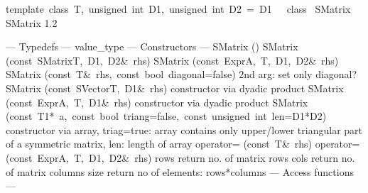\documentclass{article}
\begin{document}
\begin{cxxentry}
\begin{cxxclass}
\begin{cxxdoc}
\end{cxxdoc}
\end{cxxclass}
\begin{cxxclass}
{template\ \<class\ T,\ unsigned\ int\ D1,\ unsigned\ int\ D2\ =\ D1\>\ \ \ class\ }
        {SMatrix}
        {}
        {SMatrix
}
        {1.2}
\begin{cxxpublic}
\cxxitem{}
        {--- Typedefs --- }
        {}
        {}
        {}
\label{cxx.1.2.3}
        {value\_type}
        {}
        {}
        {}
\label{cxx.1.2.4}
\cxxitem{}
        {--- Constructors --- }
        {}
        {}
        {}
\label{cxx.1.2.5}
\cxxitem{}
        {SMatrix}
        {()}
        {}
        {}
\label{cxx.1.2.6}
\cxxitem{}
        {SMatrix}
        {(const\ SMatrix\<T,\ D1,\ D2\>\&\ rhs)}
        {}
        {}
\label{cxx.1.2.7}
        {SMatrix}
        {(const\ Expr\<A,\ T,\ D1,\ D2\>\&\ rhs)}
        {}
        {}
\label{cxx.1.2.8}
\cxxitem{}
        {SMatrix}
        {(const\ T\&\ rhs,\ const\ bool\ diagonal=false)}
        { 2nd arg: set only diagonal?}
        {}
\label{cxx.1.2.9}
\cxxitem{}
        {SMatrix}
        {(const\ SVector\<T,\ D1\>\&\ rhs)}
        { constructor via dyadic product}
        {}
\label{cxx.1.2.10}
        {SMatrix}
        {(const\ Expr\<A,\ T,\ D1\>\&\ rhs)}
        { constructor via dyadic product}
        {}
\label{cxx.1.2.11}
        {SMatrix}
        {(const\ T1*\ a,\ const\ bool\ triang=false,\ const\ unsigned\ int\ len=D1*D2)}
        {constructor via array, triag=true: array contains only upper/lower
triangular part of a symmetric matrix, len: length of array }
        {}
\label{cxx.1.2.12}
        {operator=}
        {(const\ T\&\ rhs)}
        {}
        {}
\label{cxx.1.2.13}
        {operator=}
        {(const\ Expr\<A,\ T,\ D1,\ D2\>\&\ rhs)}
        {}
        {}
\label{cxx.1.2.14}
        {rows}
        {}
        { return no. of matrix rows}
        {}
\label{cxx.1.2.15}
        {cols}
        {}
        { return no. of matrix columns}
        {}
\label{cxx.1.2.16}
        {size}
        {}
        { return no of elements: rows*columns}
        {}
\label{cxx.1.2.17}
\cxxitem{}
        {--- Access functions --- }
        {}

\end{cxxpublic}
\end{cxxclass}
\end{cxxentry}
\end{document}
